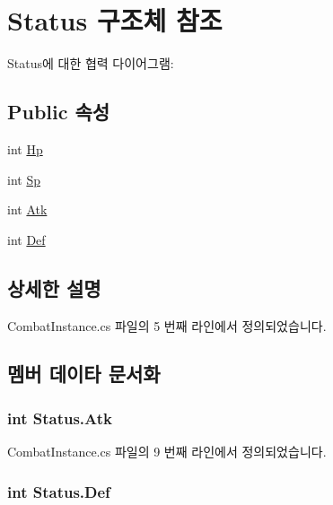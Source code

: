 \hypertarget{struct_status}{}\section{Status 구조체 참조}
\label{struct_status}


Status에 대한 협력 다이어그램\+:
\subsection*{Public 속성}
\begin{DoxyCompactItemize}
\item 
int \hyperlink{struct_status_a81b0c200ac8f8285e57cd4cc7bfd1fbf}{Hp}
\item 
int \hyperlink{struct_status_a71c109a2932f2f43a780485f6bf1209d}{Sp}
\item 
int \hyperlink{struct_status_a60abcd71f2c5226ae8466b01b1fa56e6}{Atk}
\item 
int \hyperlink{struct_status_a57d7e201d642441114f0426e449f6b45}{Def}
\end{DoxyCompactItemize}


\subsection{상세한 설명}


Combat\+Instance.\+cs 파일의 5 번째 라인에서 정의되었습니다.



\subsection{멤버 데이타 문서화}
\subsubsection[{\texorpdfstring{Atk}{Atk}}]{\setlength{\rightskip}{0pt plus 5cm}int Status.\+Atk}\hypertarget{struct_status_a60abcd71f2c5226ae8466b01b1fa56e6}{}\label{struct_status_a60abcd71f2c5226ae8466b01b1fa56e6}


Combat\+Instance.\+cs 파일의 9 번째 라인에서 정의되었습니다.

\subsubsection[{\texorpdfstring{Def}{Def}}]{\setlength{\rightskip}{0pt plus 5cm}int Status.\+Def}\hypertarget{struct_status_a57d7e201d642441114f0426e449f6b45}{}\label{struct_status_a57d7e201d642441114f0426e449f6b45}


